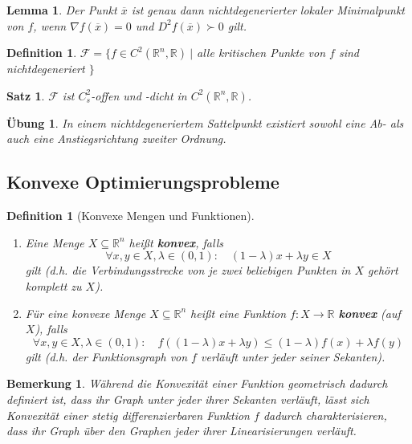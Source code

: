 \documentclass[11pt]{scrreprt}
\newcounter{thm}
\theoremstyle{thmstyle}
\numberwithin{thm}{section}
\newtheorem{definition}[thm]{Definition}
\newtheorem{lemma}[thm]{Lemma}
\newtheorem{satz}[thm]{Satz}
\newtheorem{uebung}[thm]{Übung}
\newtheorem*{bemerkung*}{Bemerkung}
\newtheorem*{definition*}{Definition}
\begin{document}
\begin{lemma}
	Der Punkt $\overline{x}$ ist genau dann nichtdegenerierter lokaler Minimalpunkt von $f$, wenn $\nabla f(\overline{x}) = 0$ und $D^2 f(\overline{x}) \succ 0$ gilt.
\end{lemma}

\begin{definition*}
	$\mathcal{F} = \big\{ f \in C^2(\mathbb{R}^n, \mathbb{R}) ~|$ alle kritischen Punkte von $f$ sind nichtdegeneriert $\big\}$	
\end{definition*}

\begin{satz}
	$\mathcal{F}$ ist $C_s^2$-offen und -dicht in $C^2(\mathbb{R}^n, \mathbb{R})$.
\end{satz}

\begin{uebung}
	In einem nichtdegeneriertem Sattelpunkt existiert sowohl eine Ab- als auch eine Anstiegsrichtung zweiter Ordnung.
\end{uebung}

\subsection*{Konvexe Optimierungsprobleme}

\begin{definition}[Konvexe Mengen und Funktionen] ~\
	\begin{enumerate}[label=\alph*\upshape)]
		\item Eine Menge $X \subseteq \mathbb{R}^n$ heißt \textbf{konvex}, falls
			$$ \forall x,y \in X, \lambda \in (0, 1): \quad (1-\lambda) x + \lambda y \in X $$
			gilt (d.h. die Verbindungsstrecke von je zwei beliebigen Punkten in $X$ gehört komplett zu $X$).
		\item Für eine konvexe Menge $X \subseteq \mathbb{R}^n$ heißt eine Funktion $f \colon X \rightarrow \mathbb{R}$ \textbf{konvex} (auf $X$), falls
			$$ \forall x, y \in X, \lambda \in (0, 1): \quad f((1-\lambda) x + \lambda y) \leq (1-\lambda) f(x) + \lambda f(y) $$
			gilt (d.h. der Funktionsgraph von $f$ verläuft unter jeder seiner Sekanten).
	\end{enumerate}
\end{definition}

\begin{bemerkung*}
	Während die Konvexität einer Funktion geometrisch dadurch definiert ist, dass ihr Graph unter jeder ihrer Sekanten verläuft, lässt sich Konvexität einer stetig differenzierbaren Funktion $f$ dadurch charakterisieren, dass ihr Graph über den Graphen jeder ihrer Linearisierungen verläuft.	
\end{bemerkung*}
\end{document}

